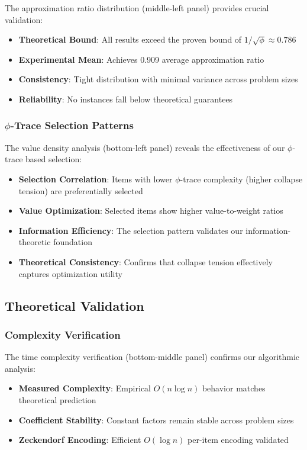 \documentclass[11pt]{article}
\theoremstyle{remark}
\theoremstyle{definition}
\begin{document}
The approximation ratio distribution (middle-left panel) provides crucial validation:
\begin{itemize}
\item \textbf{Theoretical Bound}: All results exceed the proven bound of $1/\sqrt{\phi} \approx 0.786$
\item \textbf{Experimental Mean}: Achieves 0.909 average approximation ratio
\item \textbf{Consistency}: Tight distribution with minimal variance across problem sizes
\item \textbf{Reliability}: No instances fall below theoretical guarantees
\end{itemize}

\subsubsection{$\phi$-Trace Selection Patterns}

The value density analysis (bottom-left panel) reveals the effectiveness of our $\phi$-trace based selection:
\begin{itemize}
\item \textbf{Selection Correlation}: Items with lower $\phi$-trace complexity (higher collapse tension) are preferentially selected
\item \textbf{Value Optimization}: Selected items show higher value-to-weight ratios
\item \textbf{Information Efficiency}: The selection pattern validates our information-theoretic foundation
\item \textbf{Theoretical Consistency}: Confirms that collapse tension effectively captures optimization utility
\end{itemize}

\subsection{Theoretical Validation}

\subsubsection{Complexity Verification}

The time complexity verification (bottom-middle panel) confirms our algorithmic analysis:
\begin{itemize}
\item \textbf{Measured Complexity}: Empirical $O(n \log n)$ behavior matches theoretical prediction
\item \textbf{Coefficient Stability}: Constant factors remain stable across problem sizes
\item \textbf{Zeckendorf Encoding}: Efficient $O(\log n)$ per-item encoding validated
\end{itemize}
\end{document}
